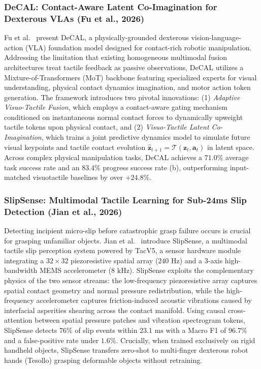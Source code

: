 \subsubsection{DeCAL: Contact-Aware Latent Co-Imagination for Dexterous VLAs (Fu et al., 2026)}
Fu et al.~\cite{Fu2026DeCAL} present DeCAL, a physically-grounded dexterous vision-language-action (VLA) foundation model designed for contact-rich robotic manipulation. Addressing the limitation that existing homogeneous multimodal fusion architectures treat tactile feedback as passive observations, DeCAL utilizes a Mixture-of-Transformers (MoT) backbone featuring specialized experts for visual understanding, physical contact dynamics imagination, and motor action token generation. The framework introduces two pivotal innovations: (1) \emph{Adaptive Visuo-Tactile Fusion}, which employs a contact-aware gating mechanism conditioned on instantaneous normal contact forces to dynamically upweight tactile tokens upon physical contact, and (2) \emph{Visuo-Tactile Latent Co-Imagination}, which trains a joint predictive dynamics model to simulate future visual keypoints and tactile contact evolution $\hat{\mathbf{z}}_{t+1} = \mathcal{T}(\mathbf{z}_t, \mathbf{a}_t)$ in latent space. Across complex physical manipulation tasks, DeCAL achieves a $71.0\%$ average task success rate and an $83.4\%$ progress success rate (b), outperforming input-matched visuotactile baselines by over $+24.8\%$.

\subsubsection{SlipSense: Multimodal Tactile Learning for Sub-24ms Slip Detection (Jian et al., 2026)}
Detecting incipient micro-slip before catastrophic grasp failure occurs is crucial for grasping unfamiliar objects. Jian et al.~\cite{Jian2026SlipSense} introduce SlipSense, a multimodal tactile slip perception system powered by TacV5, a sensor hardware module integrating a $32 \times 32$ piezoresistive spatial array ($240\text{ Hz}$) and a 3-axis high-bandwidth MEMS accelerometer ($8\text{ kHz}$). SlipSense exploits the complementary physics of the two sensor streams: the low-frequency piezoresistive array captures spatial contact geometry and normal pressure redistribution, while the high-frequency accelerometer captures friction-induced acoustic vibrations caused by interfacial asperities shearing across the contact manifold. Using causal cross-attention between spatial pressure patches and vibration spectrogram tokens, SlipSense detects $76\%$ of slip events within $23.1\text{ ms}$ with a Macro F1 of $96.7\%$ and a false-positive rate under $1.6\%$. Crucially, when trained exclusively on rigid handheld objects, SlipSense transfers zero-shot to multi-finger dexterous robot hands (Tesollo) grasping deformable objects without retraining.


